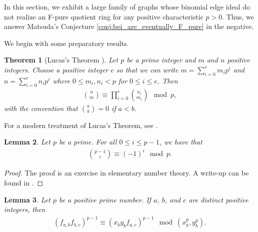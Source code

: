 \documentclass[12pt,a4paper]{amsart}
\theoremstyle{plain}
\newtheorem{thrm}{Theorem}[section]
\def\bthm{\begin{thrm}}
\def\ethm{\end{thrm}}
\newtheorem{lemma}[thrm]{Lemma}
\theoremstyle{definition}
\theoremstyle{remark}
\begin{document}



In this section, we exhibit a large family of graphs whose binomial edge ideal do not realize an F-pure quotient ring for any positive characteristic $p > 0$. Thus, we answer Matsuda's Conjecture \ref{conj:bei_are_eventually_F_pure} in the negative.  

We begin with some preparatory results.

\bthm[Lucas's Theorem {\cite{lucas1878theorie}}]
\label{thm_Lucas}
Let $p$ be a prime integer and $m$ and $n$ positive integers. Choose a positive integer $e$ so that we can write $m = \sum_{i=0}^{e} m_{i}p^{i}$ and $n = \sum_{i=0}^{e} n_{i} p^{i}$ where $0 \leq m_{i}, n_{i} < p$ for $0 \leq i \leq e$. Then
\begin{align*}
\binom{n}{m} \equiv \prod_{i=0}^{e} \binom{n_{i}}{m_{i}} \mod{p},
\end{align*}
with the convention that $\binom{a}{b} = 0$ if $a < b$.
\ethm

\noindent For a modern treatment of Lucas's Theorem, see \cite[Theorem 1]{Fine47}.

\begin{lemma}
\label{lem:binom_coeff_mod_p}
Let $p$ be a prime. For all $0 \leq i \leq p-1$, we have that
\begin{align*}
    \binom{p-1}{i} \equiv (-1)^i \mod{p}.
\end{align*}

\end{lemma}

\begin{proof}
The proof is an exercise in elementary number theory. A write-up can be found in \cite{binomialIdentity}.
\end{proof}

\begin{lemma}
\label{lem:switching_terms}
Let $p$ be a positive prime number. If $a$, $b$, and $c$ are distinct positive integers, then
\begin{align*}
(f_{a,b}f_{b,c})^{p-1} \equiv (x_by_bf_{a,c})^{p-1}    \mod{(x_{b}^{p}, y_{b}^{p})}.
\end{align*}
\end{lemma}
\end{document}
